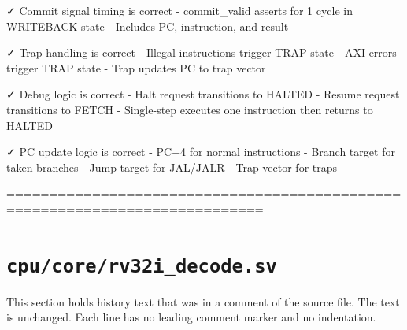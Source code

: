 \begin{record}
\begin{textblock}
✓ Commit signal timing is correct
  - commit_valid asserts for 1 cycle in WRITEBACK state
  - Includes PC, instruction, and result

✓ Trap handling is correct
  - Illegal instructions trigger TRAP state
  - AXI errors trigger TRAP state
  - Trap updates PC to trap vector

✓ Debug logic is correct
  - Halt request transitions to HALTED
  - Resume request transitions to FETCH
  - Single-step executes one instruction then returns to HALTED

✓ PC update logic is correct
  - PC+4 for normal instructions
  - Branch target for taken branches
  - Jump target for JAL/JALR
  - Trap vector for traps

============================================================================
\end{textblock}

\end{record}

\section{\texttt{cpu/core/rv32i\_decode.sv}}\label{cr:mod:rv32i-decode}

This section holds history text that was in a comment of the source file. The text is unchanged. Each line has no leading comment marker and no indentation.

